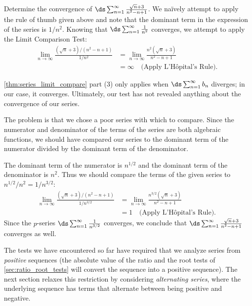 \begin{example}\label{ex_lct3}
Determine the convergence of $\ds\sum_{n=1}^\infty \frac{\sqrt{n}+3}{n^2-n+1}$.
\solution
We naïvely attempt to apply the rule of thumb given above and note that the dominant term in the expression of the series is $1/n^2$. Knowing that $\ds \sum_{n=1}^\infty \frac1{n^2}$ converges, we attempt to apply the Limit Comparison Test:
\begin{align*}
	\lim_{n\to\infty}\frac{(\sqrt{n}+3)/(n^2-n+1)}{1/n^2}
	&=\lim_{n\to\infty}\frac{n^2(\sqrt n+3)}{n^2-n+1}\\
	&= \infty \quad \text{(Apply L'Hôpital's Rule)}.
\end{align*}

\autoref{thm:series_limit_compare} part (3) only applies when $\ds\sum_{n=1}^\infty b_n$ diverges; in our case, it converges. Ultimately, our test has not revealed anything about the convergence of our series.

The problem is that we chose a poor series with which to compare. Since the numerator and denominator of the terms of the series are both algebraic functions, we should have compared our series  to the dominant term of the numerator divided by the dominant term of the denominator.

The dominant term of the numerator is $n^{1/2}$ and the dominant term of the denominator is $n^2$. Thus we should compare the terms of the given series to $n^{1/2}/n^2 = 1/n^{3/2}$:
\begin{align*}
\lim_{n\to\infty}\frac{(\sqrt{n}+3)/(n^2-n+1)}{1/n^{3/2}} &= \lim_{n\to \infty} \frac{n^{3/2}(\sqrt n+3)}{n^2-n+1} \\
		&= 1\quad \text{(Apply L'Hôpital's Rule)}.
\end{align*}
Since the  $p$-series $\ds\sum_{n=1}^\infty \frac1{n^{3/2}}$ converges, we conclude that $\ds\sum_{n=1}^\infty \frac{\sqrt{n}+3}{n^2-n+1}$ converges as well.
\end{example}

The tests we have encountered so far have required that we analyze series from \emph{positive} sequences (the absolute value of the ratio and the root tests of \autoref{sec:ratio_root_tests} will convert the sequence into a positive sequence). The next section relaxes this restriction by  considering \emph{alternating series}, where the underlying sequence has terms that alternate between being positive and negative.


